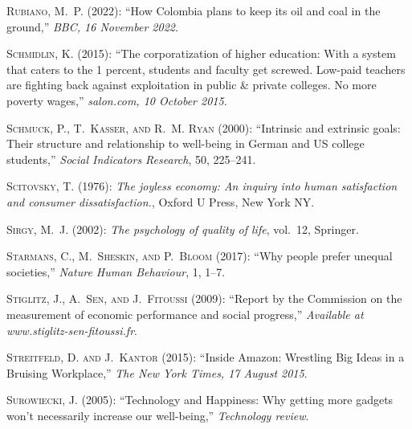 \documentclass[10pt, letterpaper]{article}
\begin{document}
\begin{spacing}{2}
\begin{thebibliography}{120}
\textsc{Rubiano, M.~P.} (2022): \enquote{How Colombia plans to keep its oil and
  coal in the ground,} \emph{BBC, 16 November 2022}.

\textsc{Schmidlin, K.} (2015): \enquote{The corporatization of higher
  education: With a system that caters to the 1 percent, students and faculty
  get screwed. Low-paid teachers are fighting back against exploitation in
  public \& private colleges. No more poverty wages,} \emph{salon.com, 10
  October 2015}.

\textsc{Schmuck, P., T.~Kasser, and R.~M. Ryan} (2000): \enquote{Intrinsic and
  extrinsic goals: Their structure and relationship to well-being in German and
  US college students,} \emph{Social Indicators Research}, 50, 225--241.

\textsc{Scitovsky, T.} (1976): \emph{The joyless economy: An inquiry into human
  satisfaction and consumer dissatisfaction.}, Oxford U Press, New York NY.

\textsc{Sirgy, M.~J.} (2002): \emph{The psychology of quality of life},
  vol.~12, Springer.

\textsc{Starmans, C., M.~Sheskin, and P.~Bloom} (2017): \enquote{Why people
  prefer unequal societies,} \emph{Nature Human Behaviour}, 1, 1--7.

\textsc{Stiglitz, J., A.~Sen, and J.~Fitoussi} (2009): \enquote{Report by the
  Commission on the measurement of economic performance and social progress,}
  \emph{Available at www.stiglitz-sen-fitoussi.fr}.

\textsc{Streitfeld, D. and J.~Kantor} (2015): \enquote{Inside Amazon: Wrestling
  Big Ideas in a Bruising Workplace,} \emph{The New York Times, 17 August
  2015}.

\textsc{Surowiecki, J.} (2005): \enquote{Technology and Happiness: Why getting
  more gadgets won't necessarily increase our well-being,} \emph{Technology
  review}.


\end{thebibliography}
\end{spacing}
\end{document}
